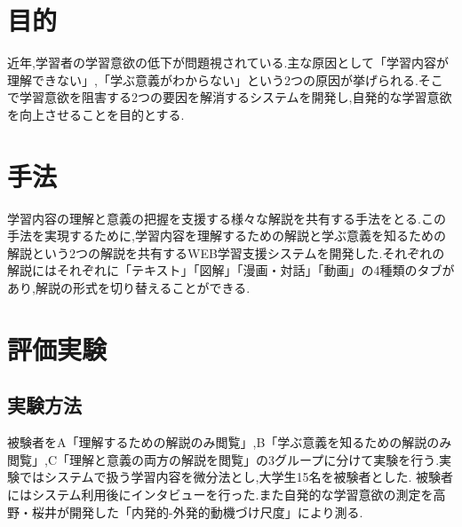 \documentclass{jsarticle}
\begin{document}

\semi

\section{目的}

近年,学習者の学習意欲の低下が問題視されている.主な原因として「学習内容が理解できない」,「学ぶ意義がわからない」という2つの原因が挙げられる.そこで学習意欲を阻害する2つの要因を解消するシステムを開発し,自発的な学習意欲を向上させることを目的とする.

\section{手法}

学習内容の理解と意義の把握を支援する様々な解説を共有する手法をとる.この手法を実現するために,学習内容を理解するための解説と学ぶ意義を知るための解説という2つの解説を共有するWEB学習支援システムを開発した.それぞれの解説にはそれぞれに「テキスト」「図解」「漫画・対話」「動画」の4種類のタブがあり,解説の形式を切り替えることができる.

\section{評価実験}
\subsection{実験方法}
被験者をA「理解するための解説のみ閲覧」,B「学ぶ意義を知るための解説のみ閲覧」,C「理解と意義の両方の解説を閲覧」の3グループに分けて実験を行う.実験ではシステムで扱う学習内容を微分法とし,大学生15名を被験者とした.
被験者にはシステム利用後にインタビューを行った.また自発的な学習意欲の測定を高野・桜井が開発した「内発的-外発的動機づけ尺度」により測る.
\end{document}
